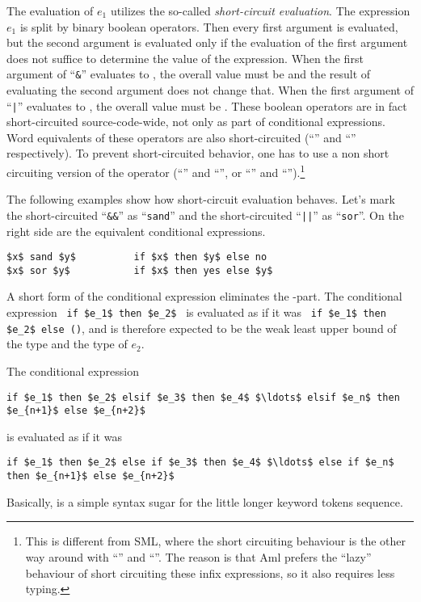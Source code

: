 The evaluation of $e_1$ utilizes the so-called {\em short-circuit evaluation}. The expression $e_1$ is split by binary boolean operators. Then every first argument is evaluated, but the second argument is evaluated only if the evaluation of the first argument does not suffice to determine the value of the expression. When the first argument of ``\lstinline!&!'' evaluates to , the overall value must be  and the result of evaluating the second argument does not change that. When the first argument of ``\lstinline!|!'' evaluates to , the overall value must be . These boolean operators are in fact short-circuited source-code-wide, not only as part of conditional expressions. Word equivalents of these operators are also short-circuited (``'' and ``'' respectively). To prevent short-circuited behavior, one has to use a non short circuiting version of the operator (``'' and ``'', or ``\code{&&}'' and ``\code{||}'').\footnote{This is different from SML, where the short circuiting behaviour is the other way around with ``'' and ``''. The reason is that Aml prefers the ``lazy'' behaviour of short circuiting these infix expressions, so it also requires less typing.}

\example The following examples show how short-circuit evaluation behaves. Let's mark the short-circuited ``\lstinline!&&!'' as ``\lstinline!sand!'' and the short-circuited ``\lstinline!||!'' as ``\lstinline!sor!''. On the right side are the equivalent conditional expressions. 
\begin{lstlisting}
$x$ sand $y$          if $x$ then $y$ else no
$x$ sor $y$           if $x$ then yes else $y$
\end{lstlisting}

A short form of the conditional expression eliminates the -part. The conditional expression ~\lstinline!if $e_1$ then $e_2$!~ is evaluated as if it was ~\lstinline!if $e_1$ then $e_2$ else ()!, and is therefore expected to be the weak least upper bound of the type  and the type of $e_2$. 

The conditional expression 
\begin{lstlisting}
if $e_1$ then $e_2$ elsif $e_3$ then $e_4$ $\ldots$ elsif $e_n$ then $e_{n+1}$ else $e_{n+2}$
\end{lstlisting} 
is evaluated as if it was 
\begin{lstlisting}
if $e_1$ then $e_2$ else if $e_3$ then $e_4$ $\ldots$ else if $e_n$ then $e_{n+1}$ else $e_{n+2}$
\end{lstlisting}
Basically,  is a simple syntax sugar for the little longer  keyword tokens sequence. 

